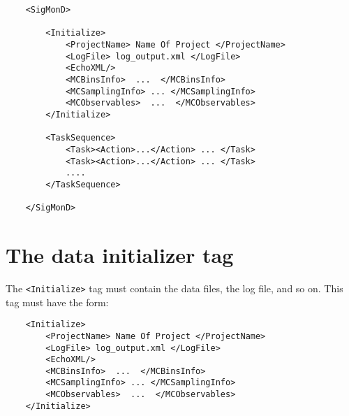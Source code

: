 \documentclass[12pt]{article}
\newcommand{\vb}{\texttt}
\begin{document}
\begin{verbatim}
    <SigMonD>

        <Initialize>
            <ProjectName> Name Of Project </ProjectName>
            <LogFile> log_output.xml </LogFile>
            <EchoXML/>
            <MCBinsInfo>  ...  </MCBinsInfo> 
            <MCSamplingInfo> ... </MCSamplingInfo>
            <MCObservables>  ...  </MCObservables>
        </Initialize>

        <TaskSequence>
            <Task><Action>...</Action> ... </Task>
            <Task><Action>...</Action> ... </Task>
            .... 
        </TaskSequence>

    </SigMonD>
\end{verbatim}

\section{The data initializer tag}
The \vb{<Initialize>} tag must contain the data files, the log file, and so on. 
This tag must have the form:
\begin{verbatim}
    <Initialize>
        <ProjectName> Name Of Project </ProjectName>
        <LogFile> log_output.xml </LogFile>
        <EchoXML/>
        <MCBinsInfo>  ...  </MCBinsInfo> 
        <MCSamplingInfo> ... </MCSamplingInfo>
        <MCObservables>  ...  </MCObservables>
    </Initialize>
\end{verbatim}
\end{document}
